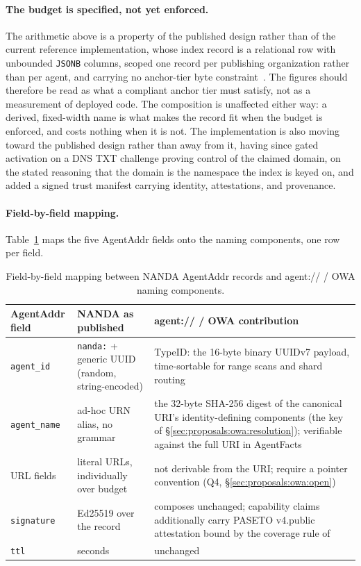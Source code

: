 \paragraph{The budget is specified, not yet enforced.}
The arithmetic above is a property of the published
design rather than of the current reference
implementation, whose index record is a relational row
with unbounded \texttt{JSONB} columns, scoped one record
per publishing organization rather than per agent, and
carrying no anchor-tier byte
constraint~\cite{nanda_index_impl}. The figures should
therefore be read as what a compliant anchor tier must
satisfy, not as a measurement of deployed code. The
composition is unaffected either way: a derived,
fixed-width name is what makes the record fit when the
budget is enforced, and costs nothing when it is not.
The implementation is also moving toward the published
design rather than away from it, having since gated
activation on a DNS TXT challenge proving control of the
claimed domain, on the stated reasoning that the domain
is the namespace the index is keyed on, and added a
signed trust manifest carrying identity, attestations,
and provenance.

\paragraph{Field-by-field mapping.}
Table~\ref{tab:nanda-field-mapping} maps the five AgentAddr
fields onto the naming components, one row per field.

\begin{table}[h]
  \centering
  \footnotesize
  \begin{tabular}{p{2.4cm}p{3.4cm}p{4.2cm}}
    \toprule
    AgentAddr field & NANDA as published & agent:// / OWA contribution \\
    \midrule
    \texttt{agent\_id}
      & \texttt{nanda:} + generic UUID (random, string-encoded)
      & TypeID: the 16-byte binary UUIDv7 payload, time-sortable for range scans and shard routing \\
    \texttt{agent\_name}
      & ad-hoc URN alias, no grammar
      & the 32-byte SHA-256 digest of the canonical URI's identity-defining components (the key of \S\ref{sec:proposals:owa:resolution}); verifiable against the full URI in AgentFacts \\
    URL fields
      & literal URLs, individually over budget
      & not derivable from the URI; require a pointer convention (Q4, \S\ref{sec:proposals:owa:open}) \\
    \texttt{signature}
      & Ed25519 over the record
      & composes unchanged; capability claims additionally carry PASETO v4.public attestation bound by the coverage rule of~\cite{agent_uri_scheme} \\
    \texttt{ttl}
      & seconds
      & unchanged \\
    \bottomrule
  \end{tabular}
  \caption{Field-by-field mapping between NANDA AgentAddr records and agent:// / OWA naming components.}
  \label{tab:nanda-field-mapping}
\end{table}

